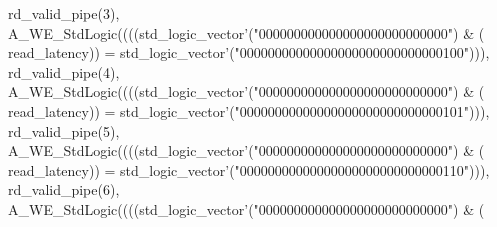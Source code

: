 \begin{DoxyCode}
{      rd_valid_pipe}\textcolor{vhdlchar}{(}\textcolor{vhdllogic}{}\textcolor{vhdllogic}{3}\textcolor{vhdlchar}{)}\textcolor{vhdlchar}{,} \textcolor{vhdlchar}{A\_WE\_StdLogic}\textcolor{vhdlchar}{(}\textcolor{vhdlchar}{(}\textcolor{vhdlchar}{(}\textcolor{vhdlchar}{(}\textcolor{comment}{std\_logic\_vector}\textcolor{vhdlchar}{'}\textcolor{vhdlchar}{(}\textcolor{vhdllogic}{"000000000000000000000000000"}\textcolor{vhdlchar}{)} \textcolor{vhdlchar}{&} \textcolor{vhdlchar}{(}\textcolor{vhdlchar}{
      read_latency}\textcolor{vhdlchar}{)}\textcolor{vhdlchar}{)} \textcolor{vhdlchar}{=} \textcolor{comment}{std\_logic\_vector}\textcolor{vhdlchar}{'}\textcolor{vhdlchar}{(}\textcolor{vhdllogic}{"00000000000000000000000000000100"}\textcolor{vhdlchar}{)}\textcolor{vhdlchar}{)}\textcolor{vhdlchar}{)}\textcolor{vhdlchar}{,} \textcolor{vhdlchar}{
      rd_valid_pipe}\textcolor{vhdlchar}{(}\textcolor{vhdllogic}{}\textcolor{vhdllogic}{4}\textcolor{vhdlchar}{)}\textcolor{vhdlchar}{,} \textcolor{vhdlchar}{A\_WE\_StdLogic}\textcolor{vhdlchar}{(}\textcolor{vhdlchar}{(}\textcolor{vhdlchar}{(}\textcolor{vhdlchar}{(}\textcolor{comment}{std\_logic\_vector}\textcolor{vhdlchar}{'}\textcolor{vhdlchar}{(}\textcolor{vhdllogic}{"000000000000000000000000000"}\textcolor{vhdlchar}{)} \textcolor{vhdlchar}{&} \textcolor{vhdlchar}{(}\textcolor{vhdlchar}{
      read_latency}\textcolor{vhdlchar}{)}\textcolor{vhdlchar}{)} \textcolor{vhdlchar}{=} \textcolor{comment}{std\_logic\_vector}\textcolor{vhdlchar}{'}\textcolor{vhdlchar}{(}\textcolor{vhdllogic}{"00000000000000000000000000000101"}\textcolor{vhdlchar}{)}\textcolor{vhdlchar}{)}\textcolor{vhdlchar}{)}\textcolor{vhdlchar}{,} \textcolor{vhdlchar}{
      rd_valid_pipe}\textcolor{vhdlchar}{(}\textcolor{vhdllogic}{}\textcolor{vhdllogic}{5}\textcolor{vhdlchar}{)}\textcolor{vhdlchar}{,} \textcolor{vhdlchar}{A\_WE\_StdLogic}\textcolor{vhdlchar}{(}\textcolor{vhdlchar}{(}\textcolor{vhdlchar}{(}\textcolor{vhdlchar}{(}\textcolor{comment}{std\_logic\_vector}\textcolor{vhdlchar}{'}\textcolor{vhdlchar}{(}\textcolor{vhdllogic}{"000000000000000000000000000"}\textcolor{vhdlchar}{)} \textcolor{vhdlchar}{&} \textcolor{vhdlchar}{(}\textcolor{vhdlchar}{
      read_latency}\textcolor{vhdlchar}{)}\textcolor{vhdlchar}{)} \textcolor{vhdlchar}{=} \textcolor{comment}{std\_logic\_vector}\textcolor{vhdlchar}{'}\textcolor{vhdlchar}{(}\textcolor{vhdllogic}{"00000000000000000000000000000110"}\textcolor{vhdlchar}{)}\textcolor{vhdlchar}{)}\textcolor{vhdlchar}{)}\textcolor{vhdlchar}{,} \textcolor{vhdlchar}{
      rd_valid_pipe}\textcolor{vhdlchar}{(}\textcolor{vhdllogic}{}\textcolor{vhdllogic}{6}\textcolor{vhdlchar}{)}\textcolor{vhdlchar}{,} \textcolor{vhdlchar}{A\_WE\_StdLogic}\textcolor{vhdlchar}{(}\textcolor{vhdlchar}{(}\textcolor{vhdlchar}{(}\textcolor{vhdlchar}{(}\textcolor{comment}{std\_logic\_vector}\textcolor{vhdlchar}{'}\textcolor{vhdlchar}{(}\textcolor{vhdllogic}{"000000000000000000000000000"}\textcolor{vhdlchar}{)} \textcolor{vhdlchar}{&} \textcolor{vhdlchar}{(}\textcolor{vhdlchar}{
}
\end{DoxyCode}
